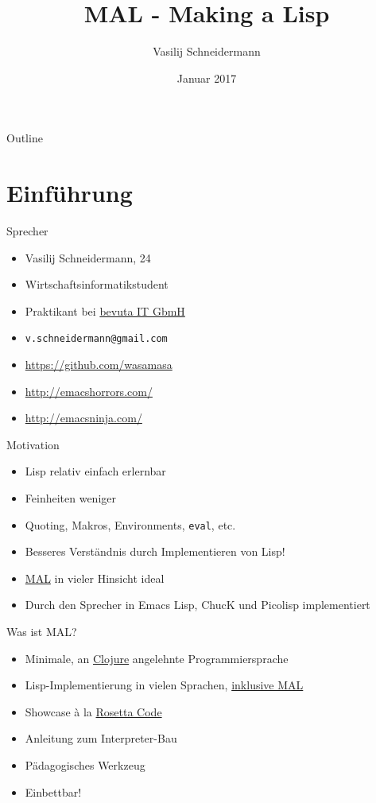 \documentclass[presentation]{beamer}
\author{Vasilij Schneidermann}
\date{Januar 2017}
\title{MAL - Making a Lisp}
\begin{document}
\maketitle
\begin{frame}{Outline}
\tableofcontents
\end{frame}

\AtBeginSection{\frame{\sectionpage}}

\section{Einführung}
\label{sec-1}

\begin{frame}[label=sec-1-1]{Sprecher}
\begin{itemize}
\item Vasilij Schneidermann, 24
\item Wirtschaftsinformatikstudent
\item Praktikant bei \href{https://www.bevuta.com/en/}{bevuta IT GbmH}
\item \texttt{v.schneidermann@gmail.com}
\item \url{https://github.com/wasamasa}
\item \url{http://emacshorrors.com/}
\item \url{http://emacsninja.com/}
\end{itemize}
\end{frame}

\begin{frame}[fragile,label=sec-1-2]{Motivation}
 \begin{itemize}
\item Lisp relativ einfach erlernbar
\item Feinheiten weniger
\item Quoting, Makros, Environments, \texttt{eval}, etc.
\item Besseres Verständnis durch Implementieren von Lisp!
\item \href{https://github.com/kanaka/mal}{MAL} in vieler Hinsicht ideal
\item Durch den Sprecher in Emacs Lisp, ChucK und Picolisp implementiert
\end{itemize}
\end{frame}

\begin{frame}[label=sec-1-3]{Was ist MAL?}
\begin{itemize}
\item Minimale, an \href{http://clojure.org/}{Clojure} angelehnte Programmiersprache
\item Lisp-Implementierung in vielen Sprachen, \href{https://en.wikipedia.org/wiki/Meta-circular_evaluator}{inklusive MAL}
\item Showcase à la \href{http://rosettacode.org/wiki/Rosetta_Code}{Rosetta Code}
\item Anleitung zum Interpreter-Bau
\item Pädagogisches Werkzeug
\item Einbettbar!
\end{itemize}
\end{frame}
\end{document}
